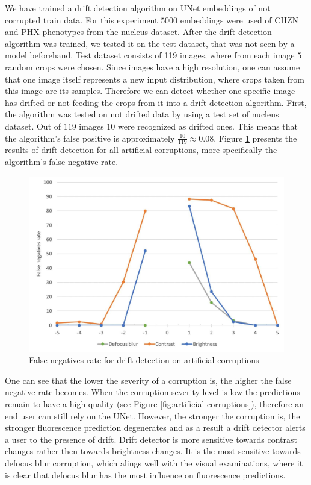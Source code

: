 We have trained a drift detection algorithm on UNet embeddings of not corrupted train data. For this experiment $5000$ embeddings were used of CHZN and PHX phenotypes from the nucleus dataset. After the drift detection algorithm was trained, we tested it on the test dataset, that was not seen by a model beforehand. Test dataset consists of 119 images, where from each image $5$ random crops were chosen. Since images have a high resolution, one can assume that one image itself represents a new input distribution, where crops taken from this image are its samples. Therefore we can detect whether one specific image has drifted or not feeding the crops from it into a drift detection algorithm. First, the algorithm was tested on not drifted data by using a test set of nucleus dataset. Out of $119$ images $10$ were recognized as drifted ones. This means that the algorithm's false positive is approximately $\frac{10}{119} \approx 0.08$. Figure \ref{fig:fn-rate} presents the results of drift detection for all artificial corruptions, more specifically the algorithm's false negative rate.
\begin{figure}[H]
	\begin{center}
		\includegraphics[width=0.5\linewidth]{bilder/drift-detection/fn-rate.jpg}
		\caption{False negatives rate for drift detection on artificial corruptions}\label{fig:fn-rate}
	\end{center}
\end{figure}
One can see that the lower the severity of a corruption is, the higher the false negative rate becomes. When the corruption severity level is low the predictions remain to have a high quality (see Figure \ref{fig:artificial-corruptions}), therefore an end user can still rely on the UNet. However, the stronger the corruption is, the stronger fluorescence prediction degenerates and as a result a drift detector alerts a user to the presence of drift. Drift detector is more sensitive towards contrast changes rather then towards brightness changes. It is the most sensitive towards defocus blur corruption, which alings well with the visual examinations, where it is clear that defocus blur has the most influence on fluorescence predictions.